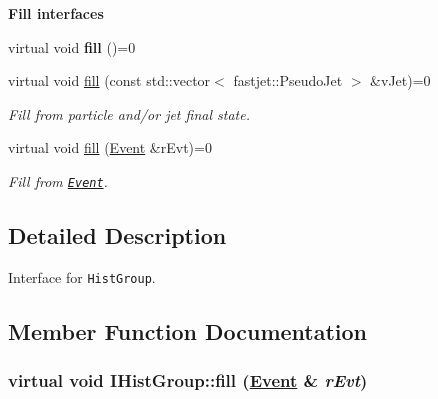\begin{Indent}{\bf Fill interfaces}\par
\begin{CompactItemize}
\item 
\hypertarget{classIHistGroup_59cbdf8b57d118f99b5769a4e9730c1c}{
virtual void \textbf{fill} ()=0}
\label{classIHistGroup_59cbdf8b57d118f99b5769a4e9730c1c}

\item 
virtual void \hyperlink{classIHistGroup_72fe456887f185ecbd538bdda92a9f5a}{fill} (const std::vector$<$ fastjet::Pseudo\-Jet $>$ \&v\-Jet)=0
\begin{CompactList}\small\item\em Fill from particle and/or jet final state. \item\end{CompactList}\item 
virtual void \hyperlink{classIHistGroup_5ccd836df9105ea290ef680b977a0e0c}{fill} (\hyperlink{classEvent}{Event} \&r\-Evt)=0
\begin{CompactList}\small\item\em Fill from {\tt \hyperlink{classEvent}{Event}}. \item\end{CompactList}\end{CompactItemize}
\end{Indent}


\subsection{Detailed Description}
Interface for {\tt Hist\-Group}. 



\subsection{Member Function Documentation}
\hypertarget{classIHistGroup_5ccd836df9105ea290ef680b977a0e0c}{
\subsubsection[fill]{\setlength{\rightskip}{0pt plus 5cm}virtual void IHist\-Group::fill (\hyperlink{classEvent}{Event} \& {\em r\-Evt})}}
\label{classIHistGroup_5ccd836df9105ea290ef680b977a0e0c}


